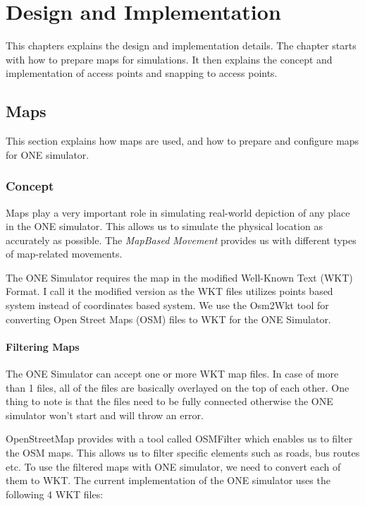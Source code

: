 
\chapter{Design and Implementation}\label{chapter:design_and_implementation}
This chapters explains the design and implementation details. The chapter starts with how to prepare maps for simulations. It then explains the concept and implementation of access points and snapping to access points.
\section{Maps}
This section explains how maps are used, and how to prepare and configure maps for ONE simulator.
	\subsection{Concept}
	Maps play a very important role in simulating real-world depiction of any place in the ONE simulator. This allows us to simulate the physical location as accurately as possible. The \textit{MapBased Movement} provides us with different types of map-related movements.

	The ONE Simulator requires the map in the modified Well-Known Text (WKT) Format. I call it the modified version as the WKT files utilizes points based system instead of coordinates based system. We use the Osm2Wkt tool\cite{mayer2010osm} for converting Open Street Maps (OSM) files to WKT for the ONE Simulator.

	\subsubsection {Filtering Maps}
	The ONE Simulator can accept one or more WKT map files. In case of more than 1 files, all of the files are basically overlayed on the top of each other. One thing to note is that the files need to be fully connected otherwise the ONE simulator won't start and will throw an error.

	OpenStreetMap provides with a tool called OSMFilter \cite{osm-filter} which enables us to filter the OSM maps. This allows us to filter specific elements such as roads, bus routes etc. To use the filtered maps with ONE simulator, we need to convert each of them to WKT.
	The current implementation of the ONE simulator uses the following 4 WKT files:

